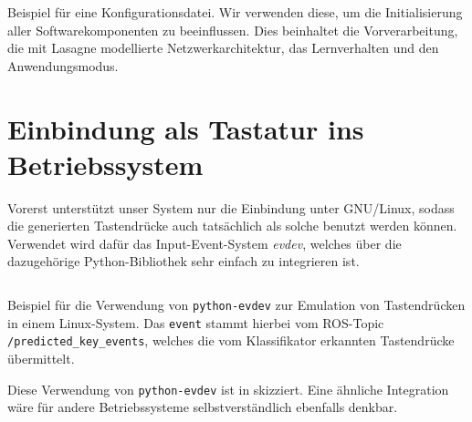 \begin{listing}
    \inputminted{yaml}{../common/code/config.yaml}
    \caption[Beispiel für eine Konfigurationsdatei]{Beispiel für eine Konfigurationsdatei. Wir verwenden diese, um die
    Initialisierung aller Softwarekomponenten zu beeinflussen. Dies beinhaltet
    die Vorverarbeitung, die mit Lasagne modellierte Netzwerkarchitektur, das
    Lernverhalten und den Anwendungsmodus.}
\end{listing}

\section{Einbindung als Tastatur ins Betriebssystem}

Vorerst unterstützt unser System nur die Einbindung unter GNU/Linux, sodass die
generierten Tastendrücke auch tatsächlich als solche benutzt werden können.
Verwendet wird dafür das Input-Event-System \emph{evdev}, welches über
die dazugehörige Python-Bibliothek sehr einfach zu integrieren ist.

\begin{listing}
    \inputminted{python}{../common/code/evdev.py}
    \caption[Beispiel für die Verwendung von \texttt{python-evdev}]{Beispiel
    für die Verwendung von \texttt{python-evdev} zur Emulation von
    Tastendrücken in einem Linux-System.  Das \texttt{event} stammt hierbei vom
    ROS-Topic \texttt{/predicted\_key\_events}, welches die vom Klassifikator
    erkannten Tastendrücke übermittelt.}
\end{listing}

Diese Verwendung von \texttt{python-evdev} ist in  skizziert.
Eine ähnliche Integration wäre für andere Betriebssysteme selbstverständlich
ebenfalls denkbar.

